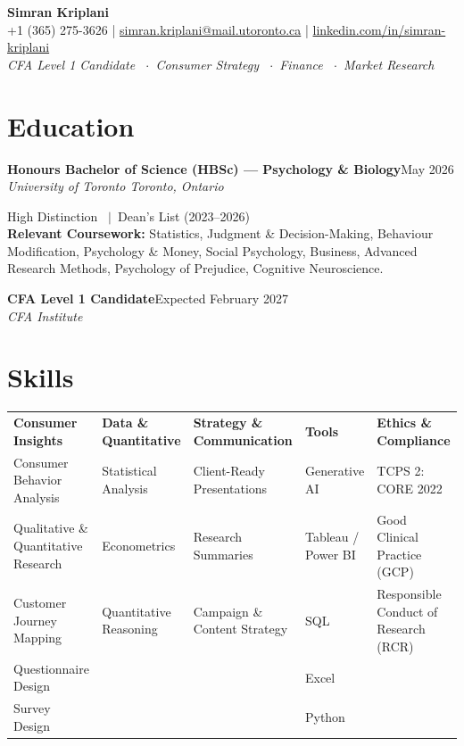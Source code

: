 \documentclass[10pt]{article}
\newcommand{\role}[4]{%
  \noindent\textbf{#1}\hfill{\small\color{graytext}#4}\\
  {\itshape\small #2 \hfill #3}\par\vspace{2pt}
}
\begin{document}
\begin{center}
  {\titlefont\Huge\bfseries\color{darktext} Simran Kriplani}\\[6pt]
  {\small
    +1 (365) 275-3626
    \quad\textcolor{rulegray}{|}\quad
    \href{mailto:simran.kriplani@mail.utoronto.ca}{simran.kriplani@mail.utoronto.ca}
    \quad\textcolor{rulegray}{|}\quad
    \href{https://www.linkedin.com/in/simran-kriplani/}{linkedin.com/in/simran-kriplani}
  }\\[4pt]
  {\small\color{accent}\itshape CFA Level 1 Candidate \ $\cdot$\ Consumer Strategy \ $\cdot$\ Finance \ $\cdot$\ Market Research}
\end{center}

\vspace{-6pt}

\section*{Education}

\role{Honours Bachelor of Science (HBSc) --- Psychology \& Biology}{University of Toronto}{Toronto, Ontario}{May 2026}
\small High Distinction \ $\vert$\ Dean's List (2023--2026)\normalsize\\[2pt]
\textbf{\small Relevant Coursework:} \small Statistics, Judgment \& Decision-Making, Behaviour Modification, Psychology \& Money, Social Psychology, Business, Advanced Research Methods, Psychology of Prejudice, Cognitive Neuroscience.\normalsize

\vspace{2pt}
\role{CFA Level 1 Candidate}{CFA Institute}{}{Expected February 2027}

\section*{Skills}

\small
\begin{tabularx}{\linewidth}{@{}>{\raggedright\arraybackslash}X >{\raggedright\arraybackslash}X >{\raggedright\arraybackslash}X >{\raggedright\arraybackslash}X >{\raggedright\arraybackslash}X@{}}
\textbf{\color{accent}Consumer Insights} & \textbf{\color{accent}Data \& Quantitative} & \textbf{\color{accent}Strategy \& Communication} & \textbf{\color{accent}Tools} & \textbf{\color{accent}Ethics \& Compliance} \\[3pt]
Consumer Behavior Analysis & Statistical Analysis & Client-Ready Presentations & Generative AI & TCPS 2: CORE 2022 \\
Qualitative \& Quantitative Research & Econometrics & Research Summaries & Tableau / Power BI & Good Clinical Practice (GCP) \\
Customer Journey Mapping & Quantitative Reasoning & Campaign \& Content Strategy & SQL & Responsible Conduct of Research (RCR) \\
Questionnaire Design & & & Excel & \\
Survey Design & & & Python & \\
\end{tabularx}
\normalsize
\end{document}
